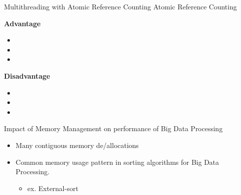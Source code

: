 \documentclass[9pt]{beamer}
\begin{document}
\begin{frame}[fragile]{Multithreading with Atomic Reference Counting}
    Atomic Reference Counting

    \vspace{0.5cm}
    \textbf{Advantage}
    \begin{itemize}
        \item {} 
        \item {}
        \item {}
    \end{itemize}

    \vspace{0.5cm}

    \textbf{Disadvantage}
    \begin{itemize}
        \item {} 
        \item {}
        \item {} 
    \end{itemize}

\end{frame}


\begin{frame}[fragile]{Impact of Memory Management on performance of Big Data Processing}

    
\begin{itemize}
    \item Many contiguous memory de/allocations
    \item Common memory usage pattern in sorting algorithms for Big Data Processing.
    \begin{itemize}
        \item  ex. External-sort
    \end{itemize}
\end{itemize}

\end{frame}

\end{document}
